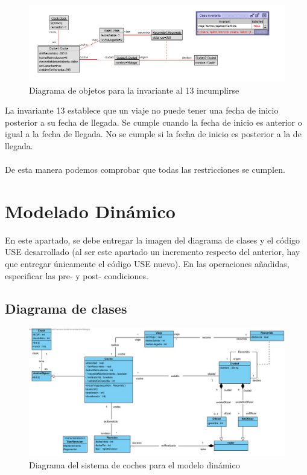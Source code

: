 \documentclass[12pt.a4paper]{article}
\begin{document}
    
 \begin{figure}[H]
     \includegraphics[width=1\linewidth]{Soils/13_v3.png}
     \caption{Diagrama de objetos para la invariante al 13 incumplirse}
\end{figure}

La invariante 13 establece que un viaje no puede tener una fecha de inicio posterior a su fecha de llegada. Se cumple cuando la fecha de inicio es anterior o igual a la fecha de llegada. No se cumple si la fecha de inicio es posterior a la de llegada.\\\\
De esta manera podemos comprobar que todas las restricciones se cumplen.

\newpage
\section{Modelado Dinámico}
En este apartado, se debe entregar la imagen del diagrama de clases y el código USE desarrollado (al ser este apartado un incremento respecto del anterior, hay que entregar únicamente el código USE nuevo). En las operaciones añadidas, especificar las pre- y post- condiciones.

\subsection{Diagrama de clases}
\begin{figure}[H]
     \includegraphics[width=1\linewidth]{diagramas/VPP_B.jpg}
     \caption{Diagrama del sistema de coches para el modelo dinámico}
\end{figure}
\end{document}
